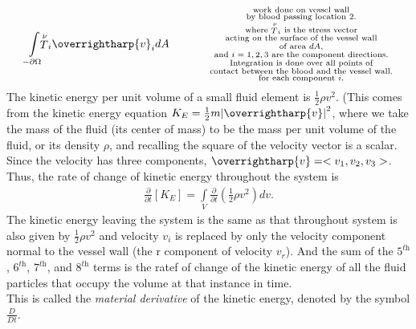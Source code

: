 \documentclass[12pt, a4paper]{article}
\theoremstyle{definition}
\theoremstyle{remark}
\theoremstyle{definition}
\newcommand*{\vtr}[1]{\text{\overrightharp{\ensuremath{#1}}}}
\newcommand{\?}{\stackrel{?}{=}}
\renewcommand{\it}[1]{\textit{#1}}
\begin{document}
\begin{align}
 \int\limits_{{-\partial \Omega}} \!\!\! {\stackrel{\nu}{T}}_{i} {\vtr{v}}_{i}dA \hspace{0.5in} \substack{\text{work done on vessel wall} \\ \text{by blood passing location 2.} \\ \text{where ${\stackrel{\nu}{T}}_{i}$ is the stress vector} \\ \text{acting on the surface of the vessel wall} \\ \text{of area $dA$}, \\ \text{and $i = 1, 2, 3$ are the component directions.} \\ \text{Integration is done over all points of} \\ \text{contact between the blood and the vessel wall.} \\ \text{for each component $i$.}}
\end{align}
\noindent The kinetic energy per unit volume of a small fluid element is $\frac{1}{2} \rho {v}^{2}$. (This comes from the kinetic energy equation ${K}_{E} = \frac{1}{2} m{|\vtr{v}|}^{2}$, where we take the mass of the fluid (its center of mass) to be the mass per unit volume of the fluid, or its density $\rho$, and recalling the square of the velocity vector is a scalar. Since the velocity has three components, $\vtr{v}=<{v}_{1}, {v}_{2}, {v}_{3}>$. Thus, the rate of change of kinetic energy throughout the system is 
\begin{align}
\frac{\partial}{\partial t} \left[ {K}_{E}\right] = \int\limits_{V} \frac{\partial}{\partial t} \left( \frac{1}{2} \rho {v}^{2} \right) dv.
\end{align}
The kinetic energy leaving the system is the same as that throughout system is also given by $\frac{1}{2} \rho {v}^{2}$ and velocity ${v}_{i}$ is replaced by only the velocity component normal to the vessel wall (the r component of velocity ${v}_{r}$). And the sum of the ${5}^{\it{th}}$, ${6}^{\it{th}}$, ${7}^{\it{th}}$, and ${8}^{\it{th}}$ terms is the ratef of change of the kinetic energy of all the fluid particles that occupy the volume at that instance in time. \\
This is called the \it{material derivative} of the kinetic energy, denoted by the symbol $\frac{D}{Dt}$.
\end{document}

